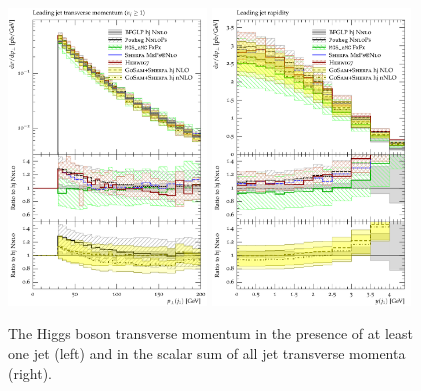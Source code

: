 \begin{figure}[t!]
  \centering
  \includegraphics[width=0.47\textwidth]{figures/hjetscomp_jet1_pT_incl.pdf}
  \hfill
  \includegraphics[width=0.47\textwidth]{figures/hjetscomp_jet1_y.pdf}
  \caption{
    The Higgs boson transverse momentum in the presence of at least one 
    jet (left) and in the scalar sum of all jet transverse momenta (right).
    \label{fig:higgscomp:results:1obs:j1pt_j1y}
  }
\end{figure}



